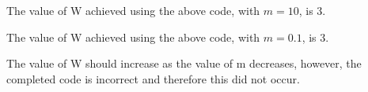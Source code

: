 

The value of W achieved using the above code, with $m=10$, is 3.



The value of W achieved using the above code, with $m=0.1$, is 3.

The value of W should increase as the value of m decreases, however, the
completed code is incorrect and therefore this did not occur.
